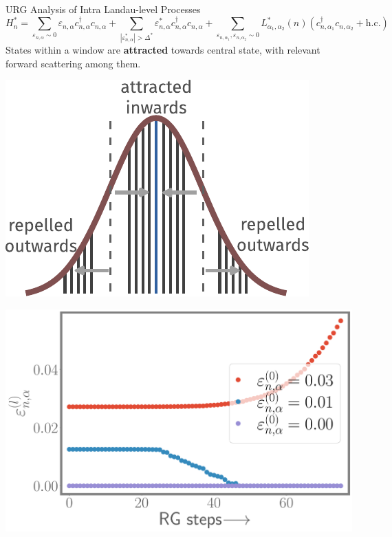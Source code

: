 \documentclass[11pt,aspectratio=169]{beamer}
\newcommand\focus[1]{%
	{\alert{\textbf{#1}}}
}
\begin{document}
\begin{frame}{URG Analysis of Intra Landau-level Processes}
\[
	H_n^* = \sum_{\varepsilon_{n,\alpha} \sim 0}\varepsilon_{n,\alpha} c^\dagger_{n, \alpha} c_{n,\alpha} + \sum_{|\varepsilon^*_{n,\alpha}| > \Delta^*}\varepsilon^*_{n,\alpha}c^\dagger_{n,\alpha} c_{n,\alpha} + \sum_{\varepsilon_{n,\alpha_1}, \varepsilon_{n,\alpha_2} \sim 0}L_{\alpha_1,\alpha_2}^*(n)\left(c^\dagger_{n, \alpha_1}c_{n,\alpha_2} + \text{h.c.}\right)
\]
States within a window are \focus{attracted} towards central state, with relevant forward scattering among them.

\begin{minipage}{0.4\textwidth}
	\includegraphics[width=\textwidth]{intraLL.pdf}
\end{minipage}
\hspace*{\fill}
\begin{minipage}{0.4\textwidth}
	\includegraphics[width=\textwidth]{intraLL_epsRG.pdf}
\end{minipage}
\end{frame}
\end{document}
